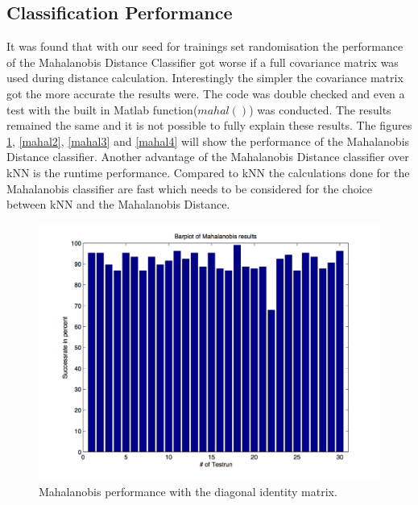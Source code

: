 \documentclass[subfigure,epsfig,fleqn,amssmb,float,caption,ausarbeitung]{scrartcl}
\begin{document}
\subsection{Classification Performance}
\label{sec:MahalanobisPerformance}

It was found that with our seed for trainings set randomisation the performance of the Mahalanobis Distance Classifier got worse if a full covariance matrix was used during distance calculation. Interestingly the simpler the covariance matrix got the more accurate the results were. The code was double checked and even a test with the built in Matlab function($mahal()$) was conducted. The results remained the same and it is not possible to fully explain these results. The figures \ref{mahal1}, \ref{mahal2}, \ref{mahal3} and \ref{mahal4} will show the performance of the Mahalanobis Distance classifier. 
Another advantage of the Mahalanobis Distance classifier over kNN is the runtime performance. Compared to kNN the calculations done for the Mahalanobis classifier are fast which needs to be considered for the choice between kNN and the Mahalanobis Distance. \\

\begin{figure}[ht]
	\centering
	\includegraphics[scale=0.75]{img/mahalanobis_results_diag_identity.jpg}
	\caption{Mahalanobis performance with the diagonal identity matrix.}
	\label{mahal1}
\end{figure}
\end{document}
